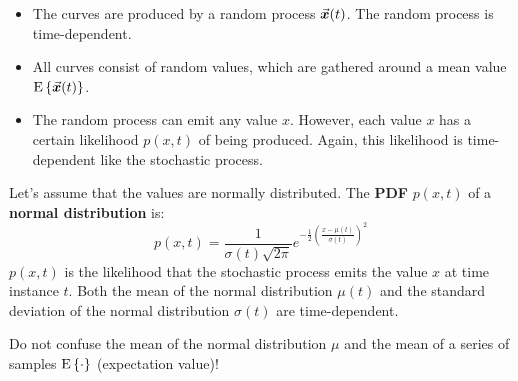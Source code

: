 \begin{refsection}
\begin{itemize}
	\item The curves are produced by a random process $\vec{\bm{x}}(t)$. The random process is time-dependent.
	\item All curves consist of random values, which are gathered around a mean value $\mathrm{E}\left\{\vec{\bm{x}}(t)\right\}$.
	\item The random process can emit any value $x$. However, each value $x$ has a certain likelihood $p(x, t)$ of being produced. Again, this likelihood is time-dependent like the stochastic process.
\end{itemize}

Let's assume that the values are normally distributed. The  \textbf{\ac{PDF}} $p(x, t)$ of a  \textbf{normal distribution} is:
\begin{equation}
	p(x, t) = \frac{1}{\sigma(t) \sqrt{2 \pi}} e^{-\frac{1}{2} \left(\frac{x - \mu(t)}{\sigma(t)}\right)^2}
\end{equation}
$p(x, t)$ is the likelihood that the stochastic process emits the value $x$ at time instance $t$. Both the mean of the normal distribution $\mu(t)$ and the standard deviation of the normal distribution $\sigma(t)$ are time-dependent.

\begin{attention}
	Do not confuse the mean of the normal distribution $\mu$ and the mean of a series of samples $\mathrm{E}\left\{\cdot\right\}$ (expectation value)!
\end{attention}

\begin{figure}[H]
	\centering
\end{figure}
\end{refsection}
